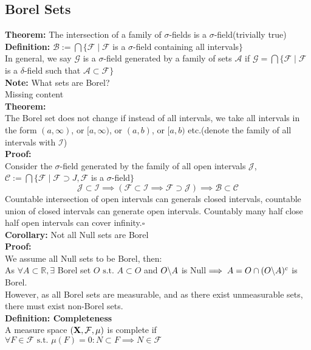 \documentclass{article}
\newcommand{\R}{\mathbb{R}}
\newcommand{\bcsl}{\symbol{92}}
\newcommand{\st}{\mbox{ s.t. }}
\newcommand{\0}{{\bf{0}}}
\newcommand{\1}{{\bf{1}}}
\begin{document}
\subsection{Borel Sets}
\textbf{Theorem:} The intersection of a family of $\sigma$-fields is a $\sigma$-field\quad(trivially true)\\
\textbf{Definition:} $\mathcal{B}:=\bigcap\{\mathcal{F}\mid \mathcal{F}$ is a $\sigma$-field containing all intervals$\}$\\
In general, we say $\mathcal{G}$ is a $\sigma$-field generated by a family of sets $\mathcal{A}$ if $\mathcal{G}=\bigcap\{\mathcal{F}\mid\mathcal{F}$ is a $\delta$-field such that $\mathcal{A}\subset\mathcal{F}\}$\\
\textbf{Note:} What sets are Borel?\\
\null\hfill{Missing content}\\
\textbf{Theorem:}\\
The Borel set does not change if instead of all intervals, we take all intervals in the form $(a,\infty)$, or $[a,\infty)$, or $(a,b)$, or $[a,b)$ etc.\quad(denote the family of all intervals with $\mathcal{I}$)\\
\textbf{Proof:}\\
Consider the $\sigma$-field generated by the family of all open intervals $\mathcal{J}$, $\mathcal{C}:=\bigcap\{\mathcal{F}\mid\mathcal{F}\supset J,\mathcal{F}$ is a $\sigma$-field$\}$
$$\mathcal{J}\subset\mathcal{I}\implies(\mathcal{F}\subset\mathcal{I}\implies\mathcal{F}\supset\mathcal{J})\implies\mathcal{B}\subset\mathcal{C}$$
Countable intersection of open intervals can generals closed intervals, countable union of closed intervals can generate open intervals. Countably many half close half open intervals can cover infinity.\quad$\square$\\
\textbf{Corollary:} Not all Null sets are Borel\\
\textbf{Proof:}\\
We assume all Null sets to be Borel, then:\\
As $\forall A\subset\R,\exists$ Borel set $O\st A\subset O$ and $O\bcsl A$ is Null$\implies A=O\cap(O\bcsl A)^c$ is Borel.\\
However, as all Borel sets are measurable, and as there exist unmeasurable sets, there must exist non-Borel sets.\\
\textbf{Definition: Completeness}\\
A measure space $({\bf{X}},\mathcal{F},\mu)$ is complete if $\forall F\in\mathcal{F}\st\mu(F)=0:N\subset F\implies N\in\mathcal{F}$\\
\end{document}
